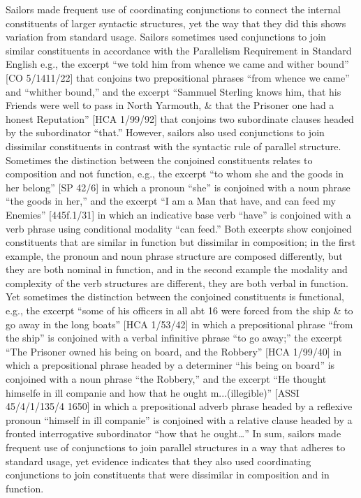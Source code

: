    Sailors made frequent use of coordinating conjunctions to connect the internal constituents of larger syntactic structures, yet the way that they did this shows variation from standard usage. Sailors sometimes used conjunctions to join similar constituents in accordance with the Parallelism Requirement in Standard English \citep[64-96,]{Osborne2006} e.g., the excerpt “we told him from whence we came and wither bound” [CO 5/1411/22] that conjoins two prepositional phrases “from whence we came” and “whither bound,” and the excerpt “Sammuel Sterling knows him, that his Friends were well to pass in North Yarmouth, \& that the Prisoner one had a honest Reputation” [HCA 1/99/92] that conjoins two subordinate clauses headed by the subordinator “that.” However, sailors also used conjunctions to join dissimilar constituents in contrast with the syntactic rule of parallel structure. Sometimes the distinction between the conjoined constituents relates to composition and not function, e.g., the excerpt “to whom she and the goods in her belong” [SP 42/6] in which a pronoun “she” is conjoined with a noun phrase “the goods in her,” and the excerpt “I am a Man that have, and can feed my Enemies” [445f.1/31] in which an indicative base verb “have” is conjoined with a verb phrase using conditional modality “can feed.” Both excerpts show conjoined constituents that are similar in function but dissimilar in composition; in the first example, the pronoun and noun phrase structure are composed differently, but they are both nominal in function, and in the second example the modality and complexity of the verb structures are different, they are both verbal in function. Yet sometimes the distinction between the conjoined constituents is functional, e.g., the excerpt “some of his officers in all abt 16 were forced from the ship \& to go away in the long boats” [HCA 1/53/42] in which a prepositional phrase “from the ship” is conjoined with a verbal infinitive phrase “to go away;” the excerpt “The Prisoner owned his being on board, and the Robbery” [HCA 1/99/40] in which a prepositional phrase headed by a determiner “his being on board” is conjoined with a noun phrase “the Robbery,” and the excerpt “He thought himselfe in ill companie and how that he ought m...(illegible)” [ASSI 45/4/1/135/4 1650] in which a prepositional adverb phrase headed by a reflexive pronoun “himself in ill companie” is conjoined with a relative clause headed by a fronted interrogative subordinator “how that he ought…” In sum, sailors made frequent use of conjunctions to join parallel structures in a way that adheres to standard usage, yet evidence indicates that they also used coordinating conjunctions to join constituents that were dissimilar in composition and in function.  

